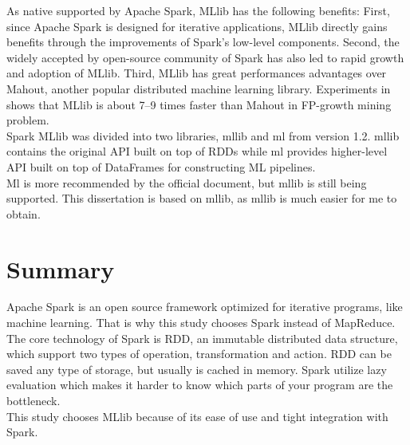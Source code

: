 As native supported by Apache Spark, MLlib has the following benefits\cite{meng2016mllib}: First, since Apache Spark is designed for iterative applications, MLlib directly gains benefits through the improvements of Spark's low-level components. Second, the widely accepted by open-source community of Spark has also led to rapid growth and adoption of MLlib. Third, MLlib has great performances advantages over Mahout, another popular distributed machine learning library. Experiments in \cite{1_li_jiang_zhang_boesch_xiao_2015} shows that MLlib is about 7--9 times faster than Mahout in FP-growth mining problem.\\


Spark MLlib was divided into two libraries, mllib and ml from version 1.2. mllib contains the original API built on top of RDDs while ml provides higher-level API built on top of DataFrames for constructing ML pipelines.\\


Ml is more recommended by the official document, but mllib is still being supported. This dissertation is based on mllib, as mllib is much easier for me to obtain.


\section{Summary}
Apache Spark is an open source framework optimized for iterative programs, like machine learning. That is why this study chooses Spark instead of MapReduce.\\


The core technology of Spark is RDD, an immutable distributed data structure, which support two types of operation, transformation and action. RDD can be saved any type of storage, but usually is cached in memory. Spark utilize lazy evaluation which makes it harder to know which parts of your program are the bottleneck.\\


This study chooses MLlib because of its ease of use and tight integration with Spark.


